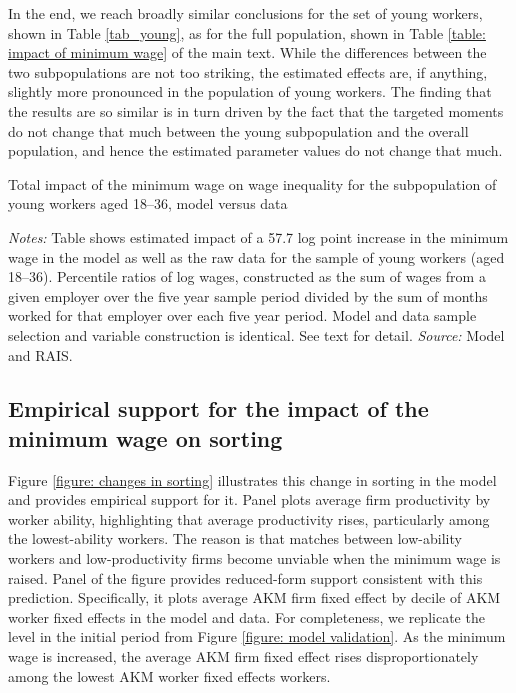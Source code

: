 In the end, we reach broadly similar conclusions for the set of young workers, shown in Table \ref{tab_young}, as for the full population, shown in Table \ref{table: impact of minimum wage} of the main text. While the differences between the two subpopulations are not too striking, the estimated effects are, if anything, slightly more pronounced in the population of young workers. The finding that the results are so similar is in turn driven by the fact that the targeted moments do not change that much between the young subpopulation and the overall population, and hence the estimated parameter values do not change that much.

\begin{table}[!htb]
  \begin{small}
    \centering
    \caption{Total impact of the minimum wage on wage inequality for the subpopulation of young workers aged 18--36, model versus data\label{tab_young}}
    
    \begin{minipage}[t]{1\columnwidth}%
      \begin{spacing}{0.75}
        {\scriptsize \textit{Notes:} Table shows estimated impact of a 57.7 log point increase in the minimum wage in the model as well as the raw data for the sample of young workers (aged 18--36). Percentile ratios of log wages, constructed as the sum of wages from a given employer over the five year sample period divided by the sum of months worked for that employer over each five year period. Model and data sample selection and variable construction is identical. See text for detail. %
        \textit{Source:} Model and RAIS.}
      \end{spacing}
    \end{minipage}
\end{small}
\end{table}




\clearpage
\subsection{Empirical support for the impact of the minimum wage on sorting\label{app_subsec:impact_sorting}}

Figure \ref{figure: changes in sorting} illustrates this change in sorting in the model and provides empirical support for it. Panel  plots average firm productivity by worker ability, highlighting that average productivity rises, particularly among the lowest-ability workers. The reason is that matches between low-ability workers and low-productivity firms become unviable when the minimum wage is raised. Panel  of the figure provides reduced-form support consistent with this prediction. Specifically, it plots average AKM firm fixed effect by decile of AKM worker fixed effects in the model and data. For completeness, we replicate the level in the initial period from Figure \ref{figure: model validation}. As the minimum wage is increased, the average AKM firm fixed effect rises disproportionately among the lowest AKM worker fixed effects workers.

